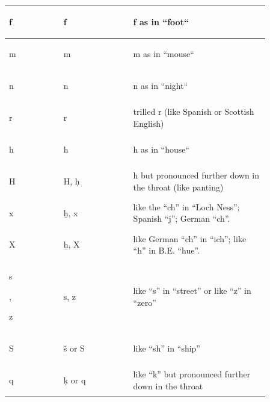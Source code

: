 \documentclass[a5paper,twoside,11pt]{report}
\begin{document}
\begin{center}
\begin{longtable}{p{0.18\linewidth} | p{0.23\linewidth} | p{0.45\linewidth}}
        \hline
        \begin{hieroglyph}f\end{hieroglyph} & f & f as in “foot“ \\
        \hline
        \begin{hieroglyph}m\end{hieroglyph} & m & m as in “mouse“ \\
        \hline
        \begin{hieroglyph}n\end{hieroglyph} & n & n as in “night“ \\
        \hline
        \begin{hieroglyph}r\end{hieroglyph} & r & trilled r (like Spanish or Scottish English) \\
        \hline
        \begin{hieroglyph}h\end{hieroglyph} & h & h as in “house“ \\
        \hline
        \begin{hieroglyph}H\end{hieroglyph} & H, ḥ & h but pronounced further down in the throat (like panting) \\
        \hline
        \begin{hieroglyph}x\end{hieroglyph} & ḫ, x & like the “ch” in “Loch Ness”; Spanish “j”; German “ch”.\\
        \hline
        \begin{hieroglyph}X\end{hieroglyph} & ẖ, X & like German “ch” in “ich”; like “h” in B.E. “hue”. \\
        \hline
        \begin{hieroglyph}s\end{hieroglyph}, \begin{hieroglyph}z\end{hieroglyph} & s, z & like “s” in “street” or like “z” in “zero” \\
        \hline
        \begin{hieroglyph}S\end{hieroglyph} & š or S & like “sh” in “ship” \\
        \hline
        \begin{hieroglyph}q\end{hieroglyph} & ḳ or q & like “k” but pronounced further down in the throat \\
        \hline

\end{longtable}
\end{center}
\end{document}
